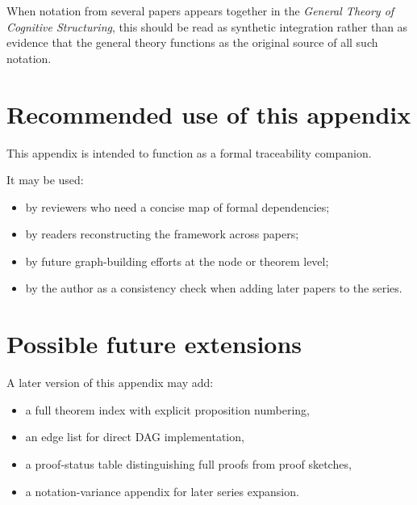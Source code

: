 \documentclass[11pt,a4paper]{article}
\begin{document}
	When notation from several papers appears together in the \emph{General Theory of Cognitive
		Structuring}, this should be read as synthetic integration rather than as evidence that the
	general theory functions as the original source of all such notation.
	
	\section{Recommended use of this appendix}
	
	This appendix is intended to function as a formal traceability companion.
	
	It may be used:
	\begin{itemize}[leftmargin=2em]
		\item by reviewers who need a concise map of formal dependencies;
		\item by readers reconstructing the framework across papers;
		\item by future graph-building efforts at the node or theorem level;
		\item by the author as a consistency check when adding later papers to the series.
	\end{itemize}
	
	\section{Possible future extensions}
	
	A later version of this appendix may add:
	\begin{itemize}[leftmargin=2em]
		\item a full theorem index with explicit proposition numbering,
		\item an edge list for direct DAG implementation,
		\item a proof-status table distinguishing full proofs from proof sketches,
		\item a notation-variance appendix for later series expansion.		
	\end{itemize}
	
\end{document}
